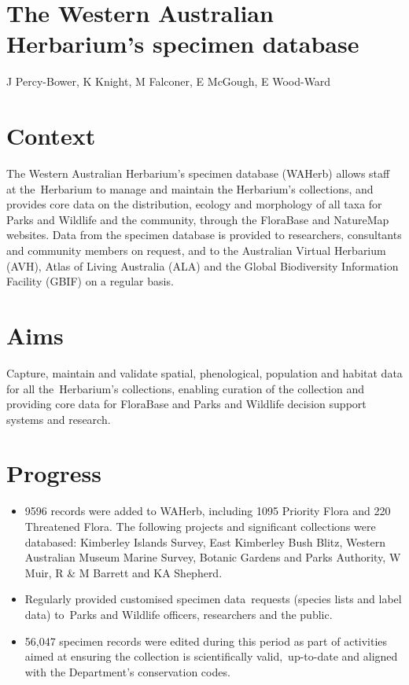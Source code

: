 \documentclass[version=last,
    paper=a4, %
    10pt, %
    usenames,
    dvipsnames,
    oneside, %
    headings=openany, %
    DIV=15 %
]{scrbook}
\begin{document}
\section*{The Western Australian Herbarium's specimen database
}

J Percy-Bower, K Knight, M Falconer, E McGough, E Wood-Ward



\section*{Context}

The Western Australian Herbarium's specimen database (WAHerb) allows
staff at the~Herbarium to manage and maintain the Herbarium's
collections, and provides core data on the distribution, ecology and
morphology of all taxa for Parks and Wildlife and the community, through
the FloraBase and NatureMap websites. Data from the specimen database is
provided to researchers, consultants and community members on request,
and to the Australian Virtual Herbarium (AVH), Atlas of Living Australia
(ALA) and the Global Biodiversity Information Facility (GBIF) on a
regular basis.




\section*{Aims}

Capture, maintain and validate spatial, phenological, population and
habitat data for all the~Herbarium's collections, enabling curation of
the collection and providing core data for FloraBase and Parks and
Wildlife decision support systems and research.




\section*{Progress}

\begin{itemize}
\itemsep1pt\parskip0pt
\item
  9596 records were added to WAHerb, including 1095 Priority Flora and
  220 Threatened Flora. The following projects and significant
  collections were databased: Kimberley Islands Survey, East Kimberley
  Bush Blitz, Western Australian Museum Marine Survey, Botanic Gardens
  and Parks Authority, W Muir, R \& M Barrett and KA Shepherd.
\item
  Regularly provided customised specimen data~requests (species lists
  and label data) to~Parks and Wildlife officers, researchers and the
  public.
\item
  56,047 specimen records were edited during this period as part of
  activities aimed at ensuring the collection is scientifically
  valid,~up-to-date and aligned with the Department's conservation
  codes.
\end{itemize}
\end{document}
